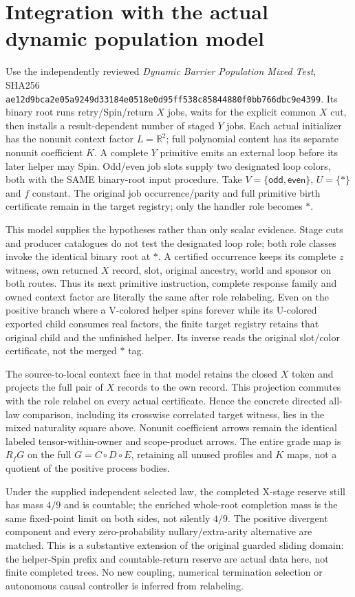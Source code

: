 \documentclass[11pt]{article}
\begin{document}
\section{Integration with the actual dynamic population model}
Use the independently reviewed \emph{Dynamic Barrier Population Mixed Test}, SHA256 \texttt{ae12d9bca2e05a9249d33184e0518e0d95ff538c85844880f0bb766dbc9e4399}. Its binary root runs retry/Spin/return $X$ jobs, waits for the explicit common $X$ cut, then installs a result-dependent number of staged $Y$ jobs. Each actual initializer has the nonunit context factor $L=\mathbb R^2$; full polynomial content has its separate nonunit coefficient $K$. A complete $Y$ primitive emits an external loop before its later helper may Spin. Odd/even job slots supply two designated loop colors, both with the SAME binary-root input procedure. Take $V=\{\mathsf{odd},\mathsf{even}\}$, $U=\{*\}$ and $f$ constant. The original job occurrence/parity and full primitive birth certificate remain in the target registry; only the handler role becomes $*$.

This model supplies the hypotheses rather than only scalar evidence. Stage cuts and producer catalogues do not test the designated loop role; both role classes invoke the identical binary root at $*$. A certified occurrence keeps its complete $z$ witness, own returned $X$ record, slot, original ancestry, world and sponsor on both routes. Thus its next primitive instruction, complete response family and owned context factor are literally the same after role relabeling. Even on the positive branch where a V-colored helper spins forever while its U-colored exported child consumes real factors, the finite target registry retains that original child and the unfinished helper. Its inverse reads the original slot/color certificate, not the merged $*$ tag.

The source-to-local context face in that model retains the closed $X$ token and projects the full pair of $X$ records to the own record. This projection commutes with the role relabel on every actual certificate. Hence the concrete directed all-law comparison, including its crosswise correlated target witness, lies in the mixed naturality square above. Nonunit coefficient arrows remain the identical labeled tensor-within-owner and scope-product arrows. The entire grade map is $R_fG$ on the full $G=C\circ D\circ E$, retaining all unused profiles and $K$ maps, not a quotient of the positive process bodies.

Under the supplied independent selected law, the completed X-stage reserve still has mass $4/9$ and is countable; the enriched whole-root completion mass is the same fixed-point limit on both sides, not silently $4/9$. The positive divergent component and every zero-probability nullary/extra-arity alternative are matched. This is a substantive extension of the original guarded sliding domain: the helper-Spin prefix and countable-return reserve are actual data here, not finite completed trees. No new coupling, numerical termination selection or autonomous causal controller is inferred from relabeling.
\end{document}
